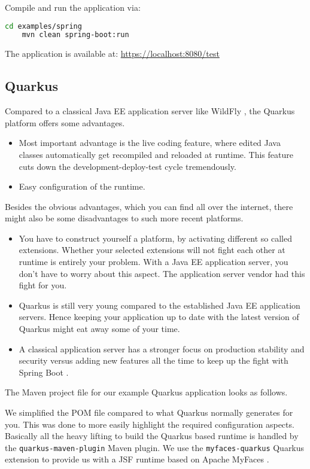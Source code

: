 Compile and run the application via:
\begin{lstlisting}[language=bash]
	cd examples/spring
	mvn clean spring-boot:run
\end{lstlisting}
The application is available at:
\url{https://localhost:8080/test}



\subsection{Quarkus}

Compared to a classical Java EE application server like WildFly \cite{WildFly}, the Quarkus \cite{quarkus} platform offers some advantages.
\begin{itemize}
	\item Most important advantage is the live coding feature, where edited Java classes automatically get recompiled and reloaded at runtime.
	This feature cuts down the development-deploy-test cycle tremendously.
	\item Easy configuration of the runtime.
\end{itemize}
Besides the obvious advantages, which you can find all over the internet, there might also be some disadvantages to such more recent platforms.
\begin{itemize}
	\item You have to construct yourself a platform, by activating different so called extensions.
	Whether your selected extensions will not fight each other at runtime is entirely your problem.
	With a Java EE application server, you don't have to worry about this aspect.
	The application server vendor had this fight for you.
	\item Quarkus is still very young compared to the established Java EE application servers.
	Hence keeping your application up to date with the latest version of Quarkus might eat away some of your time.
	\item A classical application server has a stronger focus on production stability and security versus adding new features all the time to keep up the fight with Spring Boot \cite{spring}.
\end{itemize}

The Maven project file for our example Quarkus application looks as follows.

We simplified the POM file compared to what Quarkus normally generates for you.
This was done to more easily highlight the required configuration aspects.
Basically all the heavy lifting to build the Quarkus based runtime is handled by the \texttt{quarkus-maven-plugin} Maven plugin.
We use the \texttt{myfaces-quarkus} Quarkus extension to provide us with a JSF runtime based on Apache MyFaces \cite{myfaces}.


